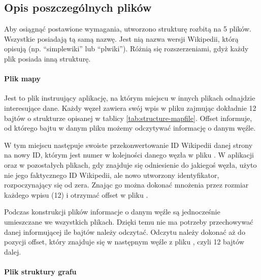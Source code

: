 \subsection{Opis poszczególnych plików}
\label{sec:opis-plikow}
Aby osiągnąć postawione wymagania, utworzono strukturę rozbitą na 5 plików. Wszystkie posiadają tą samą nazwę. Jest nią nazwa wersji Wikipedii, którą opisują (np. ``simplewiki'' lub ``plwiki''). Różnią się rozszerzeniami, gdyż każdy plik posiada inną strukturę.

\paragraph{Plik mapy }
Jest to plik instruujący aplikację, na którym miejscu w innych plikach odnajdzie interesujące dane. Każdy węzeł zawiera swój wpis w pliku  zajmując dokładnie 12 bajtów o strukturze opisanej w tablicy \ref{tab:structure-mapfile}. Offset informuje, od którego bajtu w danym pliku możemy odczytywać informację o danym węźle.


W tym miejscu następuje swoiste przekonwertowanie ID Wikipedii danej strony na nowy ID, którym jest numer w kolejności danego węzła w pliku . W aplikacji oraz w pozostałych plikach, gdy znajduje się odniesienie do jakiegoś węzła, użyto nie jego faktycznego ID Wikipedii, ale nowo utworzony identyfikator, rozpoczynający się od zera. Znając go można dokonać mnożenia przez rozmiar każdego wpisu (12) i otrzymać offset w pliku .

Podczas konstrukcji plików informacje o danym węźle są jednocześnie umieszczane we wszystkich plikach. Dzięki temu nie ma potrzeby przechowywać danej informującej ile bajtów należy odczytać. Odczytu należy dokonać aż do pozycji offset, który znajduje się w następnym węźle z pliku , czyli 12 bajtów dalej.

\paragraph{Plik struktury grafu }

